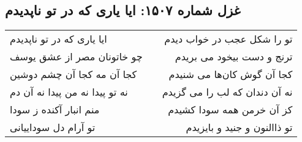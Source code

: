 \begin{center}
\section*{غزل شماره ۱۵۰۷: ایا یاری که در تو ناپدیدم}
\label{sec:1507}
\begin{longtable}{l p{0.5cm} r}
ایا یاری که در تو ناپدیدم
&&
تو را شکل عجب در خواب دیدم
\\
چو خاتونان مصر از عشق یوسف
&&
ترنج و دست بیخود می بریدم
\\
کجا آن مه کجا آن چشم دوشین
&&
کجا آن گوش کان‌ها می شنیدم
\\
نه تو پیدا نه من پیدا نه آن دم
&&
نه آن دندان که لب را می گزیدم
\\
منم انبار آکنده ز سودا
&&
کز آن خرمن همه سودا کشیدم
\\
تو آرام دل سوداییانی
&&
تو ذاالنون و جنید و بایزیدم
\\
\end{longtable}
\end{center}
